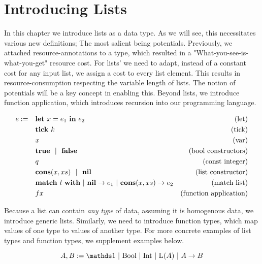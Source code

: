 \chapter{Introducing Lists}

In this chapter we introduce lists as a data type. As we will see, this necessitates various new definitions; The most salient being potentials. Previously, we attached resource-annotations to a type, which resulted in a "What-you-see-is-what-you-get" resource cost. For lists' we need to adapt, instead of a constant cost for any input list, we assign a cost to every list element. This results in resource-consumption respecting the variable length of lists. The notion of potentials will be a key concept in enabling this. Beyond lists, we introduce function application, which introduces recursion into our programming language. 

\begin{definition}
   \label{def:prog-lang-6}

\begin{align*}
   e := ~~~ & \mathbf{let}~x = e_1~\mathbf{in}~e_2		& \text{(let)}\\
            & \mathbf{tick}~k				& \text{(tick)}\\
	    & x					& \text{(var)}\\
	    & \mathbf{true} ~~| ~~\mathbf{false}		& \text{(bool constructors)}\\
	    & q					& \text{(const integer)}\\
            & \textbf{cons}(x, xs) ~~| ~~ \textbf{nil}      & \text{(list constructor)}\\
            & \textbf{match } l~\textbf{with}~|~\textbf{nil} \to e_1~|~\textbf{cons}(x, xs) \to e_2           & \text{(match list)}\\
            & f x                               & \text{(function application)}\\
\end{align*}
\end{definition}

Because a list can contain \emph{any type} of data, assuming it is homogenous data, we introduce generic lists. Similarly, we need to introduce function types, which map values of one type to values of another type. For more concrete examples of list types and function types, we supplement examples below.

\begin{definition}\label{def:type-system-6}
   \[
      A, B := \unit~|~\text{\bool}~|~\text{\typeint}~|~\ralist{}{A}~|~\rafunc{A}{B}{}{}
   \]
\end{definition}

